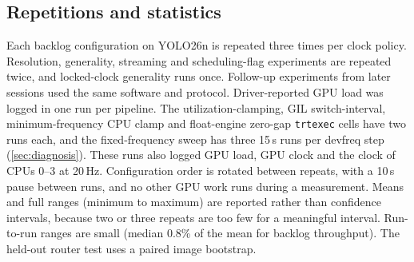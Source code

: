 \subsection{Repetitions and statistics}

Each backlog configuration on YOLO26n is repeated three times per clock
policy. Resolution, generality, streaming and scheduling-flag
experiments are repeated twice, and locked-clock generality runs once.
Follow-up experiments from later sessions used the same software and
protocol. Driver-reported GPU load was logged in one
run per pipeline. The utilization-clamping, GIL switch-interval,
minimum-frequency CPU clamp and float-engine zero-gap \texttt{trtexec}
cells have two runs each, and the fixed-frequency sweep has three 15\,s
runs per devfreq step (\cref{sec:diagnosis}). These runs also logged
GPU load, GPU clock and the clock of CPUs 0--3 at 20\,Hz.
Configuration order is rotated between repeats, with a 10\,s pause
between runs, and no other GPU work runs during a measurement. Means and full ranges (minimum to maximum) are reported
rather than confidence intervals, because two or three repeats are too
few for a meaningful interval. Run-to-run ranges are small (median 0.8\%
of the mean for backlog throughput). The held-out router test uses a
paired image bootstrap.
